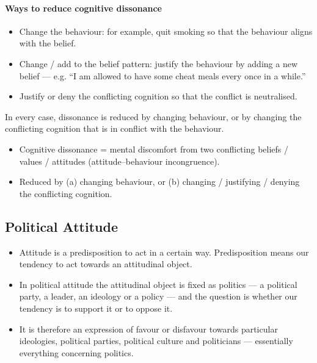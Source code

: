 \paragraph{Ways to reduce cognitive dissonance}
\begin{itemize}
\item Change the behaviour: for example, quit smoking so that the behaviour aligns with the belief.
\item Change / add to the belief pattern: justify the behaviour by adding a new belief --- e.g. ``I am allowed to have some cheat meals every once in a while.''
\item Justify or deny the conflicting cognition so that the conflict is neutralised.
\end{itemize}

In every case, dissonance is reduced by changing behaviour, or by changing the conflicting cognition that is in conflict with the behaviour.

\begin{QuickRevision}
\begin{itemize}
\item Cognitive dissonance = mental discomfort from two conflicting beliefs / values / attitudes (attitude--behaviour incongruence).
\item Reduced by (a) changing behaviour, or (b) changing / justifying / denying the conflicting cognition.
\end{itemize}
\end{QuickRevision}

\subsection{Political Attitude}

\begin{KeyConcept}
\begin{itemize}
\item Attitude is a predisposition to act in a certain way. Predisposition means our tendency to act towards an attitudinal object.
\item In political attitude the attitudinal object is fixed as politics --- a political party, a leader, an ideology or a policy --- and the question is whether our tendency is to support it or to oppose it.
\item It is therefore an expression of favour or disfavour towards particular ideologies, political parties, political culture and politicians --- essentially everything concerning politics.
\end{itemize}
\end{KeyConcept}

